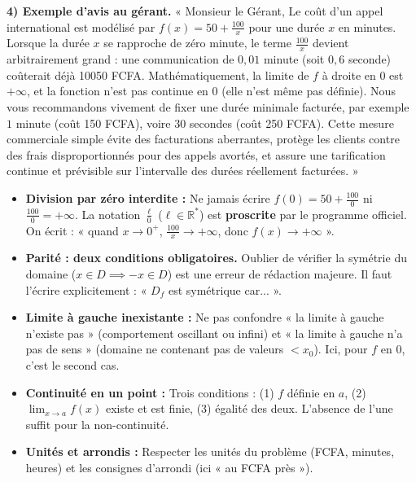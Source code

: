 \documentclass[11pt]{article}
\newcounter{popsec}
\newcounter{popsub}
\newcommand{\courssub}[1]{%
  \stepcounter{popsub}%
  \par\vspace{9pt}\noindent{\popxbold\fontsize{11.5}{13}\selectfont\color{popink}{\color{poporange}\thepopsec.\thepopsub}\hspace{6pt}#1}\par\nopagebreak\vspace{4pt}
}
\begin{document}
\begin{exoresolu}
\textbf{4) Exemple d'avis au gérant.}
« Monsieur le Gérant,
Le coût d'un appel international est modélisé par $f(x) = 50 + \frac{100}{x}$ pour une durée $x$ en minutes. Lorsque la durée $x$ se rapproche de zéro minute, le terme $\frac{100}{x}$ devient arbitrairement grand : une communication de $0{,}01$ minute (soit $0{,}6$ seconde) coûterait déjà \num{10050} FCFA. Mathématiquement, la limite de $f$ à droite en $0$ est $+\infty$, et la fonction n'est pas continue en $0$ (elle n'est même pas définie).
Nous vous recommandons vivement de fixer une durée minimale facturée, par exemple $1$ minute (coût \num{150} FCFA), voire $30$ secondes (coût \num{250} FCFA). Cette mesure commerciale simple évite des facturations aberrantes, protège les clients contre des frais disproportionnés pour des appels avortés, et assure une tarification continue et prévisible sur l'intervalle des durées réellement facturées. »
\end{exoresolu}

\courssub{Pièges à éviter}

\begin{attention}
\begin{itemize}
\item \textbf{Division par zéro interdite :} Ne jamais écrire $f(0) = 50 + \frac{100}{0}$ ni $\frac{100}{0} = +\infty$. La notation $\frac{\ell}{0}$ ($\ell \in \mathbb{R}^*$) est \textbf{proscrite} par le programme officiel. On écrit : « quand $x \to 0^+$, $\frac{100}{x} \to +\infty$, donc $f(x) \to +\infty$ ».
\item \textbf{Parité : deux conditions obligatoires.} Oublier de vérifier la symétrie du domaine ($x \in D \implies -x \in D$) est une erreur de rédaction majeure. Il faut l'écrire explicitement : « $D_f$ est symétrique car... ».
\item \textbf{Limite à gauche inexistante :} Ne pas confondre « la limite à gauche n'existe pas » (comportement oscillant ou infini) et « la limite à gauche n'a pas de sens » (domaine ne contenant pas de valeurs $< x_0$). Ici, pour $f$ en $0$, c'est le second cas.
\item \textbf{Continuité en un point :} Trois conditions : (1) $f$ définie en $a$, (2) $\lim_{x\to a} f(x)$ existe et est finie, (3) égalité des deux. L'absence de l'une suffit pour la non-continuité.
\item \textbf{Unités et arrondis :} Respecter les unités du problème (FCFA, minutes, heures) et les consignes d'arrondi (ici « au FCFA près »).
\end{itemize}
\end{attention}
\end{document}
